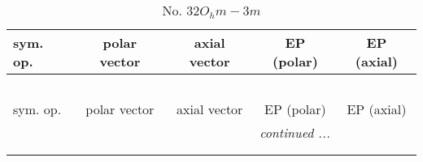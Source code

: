 \documentclass[fleqn,10pt,landscape]{jsarticle}
\begin{document}
\newpage
\begin{center}
\renewcommand{\arraystretch}{1.3}
\begin{longtable}{lcccc}
\caption{No. 32\quad$O_{h}$\quad$m-3m$\quad[ cubic ]}
 \\
 \hline \hline
sym. op. & polar vector & axial vector & EP (polar) & EP (axial) \\ \hline \endfirsthead

\multicolumn{4}{l}{\tablename\ \thetable{}} \\
 \hline \hline
sym. op. & polar vector & axial vector & EP (polar) & EP (axial) \\ \hline \endhead

 \hline \hline
\multicolumn{4}{r}{\footnotesize\it continued ...} \\ \endfoot

 \hline \hline
\multicolumn{4}{r}{} \\ \endlastfoot


\end{longtable}
\end{center}
\end{document}
